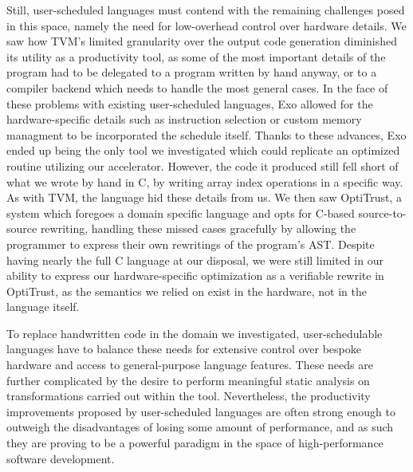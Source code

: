 \documentclass[acmsmall, nonacm=true]{acmart}
\begin{document}
Still, user-scheduled languages must contend with the remaining challenges posed in this space, namely the need for low-overhead control over hardware details. We saw how TVM's limited granularity over the output code generation diminished its utility as a productivity tool, as some of the most important details of the program had to be delegated to a program written by hand anyway, or to a compiler backend which needs to handle the most general cases. In the face of these problems with existing user-scheduled languages, Exo allowed for the hardware-specific details such as instruction selection or custom memory managment to be incorporated the schedule itself.  Thanks to these advances, Exo ended up being the only tool we investigated which could replicate an optimized routine utilizing our accelerator. However, the code it produced still fell short of what we wrote by hand in C, by writing array index operations in a specific way. As with TVM, the language hid these details from us. We then saw OptiTrust, a system which foregoes a domain specific language and opts for C-based source-to-source rewriting, handling these missed cases gracefully by allowing the programmer to express their own rewritings of the program's AST. Despite having nearly the full C language at our disposal, we were still limited in our ability to express our hardware-specific optimization as a verifiable rewrite in OptiTrust, as the semantics we relied on exist in the hardware, not in the language itself.

To replace handwritten code in the domain we investigated, user-schedulable languages have to balance these needs for extensive control over bespoke hardware and access to general-purpose language features. These needs are further complicated by the desire to perform meaningful static analysis on transformations carried out within the tool. Nevertheless, the productivity improvements proposed by user-scheduled languages are often strong enough to outweigh the disadvantages of losing some amount of performance, and as such they are proving to be a powerful paradigm in the space of high-performance software development. 




\clearpage




\clearpage
\end{document}
